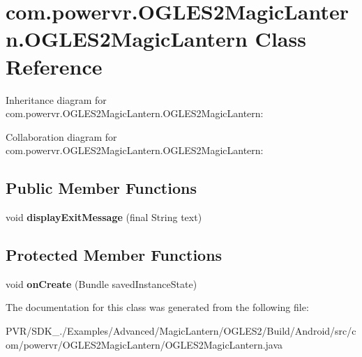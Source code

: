 \hypertarget{classcom_1_1powervr_1_1_o_g_l_e_s2_magic_lantern_1_1_o_g_l_e_s2_magic_lantern}{\section{com.\+powervr.\+O\+G\+L\+E\+S2\+Magic\+Lantern.\+O\+G\+L\+E\+S2\+Magic\+Lantern Class Reference}
\label{classcom_1_1powervr_1_1_o_g_l_e_s2_magic_lantern_1_1_o_g_l_e_s2_magic_lantern}
}


Inheritance diagram for com.\+powervr.\+O\+G\+L\+E\+S2\+Magic\+Lantern.\+O\+G\+L\+E\+S2\+Magic\+Lantern\+:


Collaboration diagram for com.\+powervr.\+O\+G\+L\+E\+S2\+Magic\+Lantern.\+O\+G\+L\+E\+S2\+Magic\+Lantern\+:
\subsection*{Public Member Functions}
\begin{DoxyCompactItemize}
\item 
\hypertarget{classcom_1_1powervr_1_1_o_g_l_e_s2_magic_lantern_1_1_o_g_l_e_s2_magic_lantern_ac1d5450a8eaac5d1ffaf61fad59907f5}{void {\bfseries display\+Exit\+Message} (final String text)}\label{classcom_1_1powervr_1_1_o_g_l_e_s2_magic_lantern_1_1_o_g_l_e_s2_magic_lantern_ac1d5450a8eaac5d1ffaf61fad59907f5}

\end{DoxyCompactItemize}
\subsection*{Protected Member Functions}
\begin{DoxyCompactItemize}
\item 
\hypertarget{classcom_1_1powervr_1_1_o_g_l_e_s2_magic_lantern_1_1_o_g_l_e_s2_magic_lantern_a442cd124384d8153d08aaa4fd6efabdb}{void {\bfseries on\+Create} (Bundle saved\+Instance\+State)}\label{classcom_1_1powervr_1_1_o_g_l_e_s2_magic_lantern_1_1_o_g_l_e_s2_magic_lantern_a442cd124384d8153d08aaa4fd6efabdb}

\end{DoxyCompactItemize}


The documentation for this class was generated from the following file\+:\begin{DoxyCompactItemize}
\item 
P\+V\+R/\+S\+D\+K\+\_./\+Examples/\+Advanced/\+Magic\+Lantern/\+O\+G\+L\+E\+S2/\+Build/\+Android/src/com/powervr/\+O\+G\+L\+E\+S2\+Magic\+Lantern/O\+G\+L\+E\+S2\+Magic\+Lantern.\+java\end{DoxyCompactItemize}
